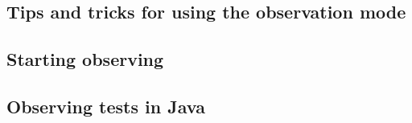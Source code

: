 % 
%
%



\subsection{Tips and tricks for using the observation mode}
\label{TasksObsModeTips}


\subsection{Starting observing}


\subsection{Observing tests in Java \gdauts{}}










%
